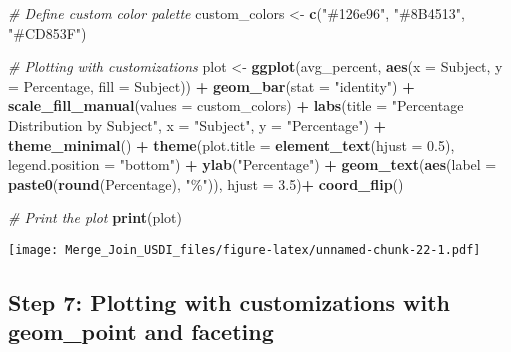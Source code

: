 \documentclass[
]{article}
\newenvironment{Shaded}{\begin{snugshade}}{\end{snugshade}}
\newcommand{\AttributeTok}[1]{\textcolor[rgb]{0.13,0.29,0.53}{#1}}
\newcommand{\CommentTok}[1]{\textcolor[rgb]{0.56,0.35,0.01}{\textit{#1}}}
\newcommand{\FloatTok}[1]{\textcolor[rgb]{0.00,0.00,0.81}{#1}}
\newcommand{\FunctionTok}[1]{\textcolor[rgb]{0.13,0.29,0.53}{\textbf{#1}}}
\newcommand{\NormalTok}[1]{#1}
\newcommand{\OtherTok}[1]{\textcolor[rgb]{0.56,0.35,0.01}{#1}}
\newcommand{\SpecialCharTok}[1]{\textcolor[rgb]{0.81,0.36,0.00}{\textbf{#1}}}
\newcommand{\StringTok}[1]{\textcolor[rgb]{0.31,0.60,0.02}{#1}}
\begin{document}
\begin{Shaded}
\begin{Highlighting}[]
\CommentTok{\# Define custom color palette}
\NormalTok{custom\_colors }\OtherTok{\textless{}{-}} \FunctionTok{c}\NormalTok{(}\StringTok{"\#126e96"}\NormalTok{, }\StringTok{"\#8B4513"}\NormalTok{, }\StringTok{"\#CD853F"}\NormalTok{) }

\CommentTok{\# Plotting with customizations}
\NormalTok{plot }\OtherTok{\textless{}{-}} \FunctionTok{ggplot}\NormalTok{(avg\_percent, }\FunctionTok{aes}\NormalTok{(}\AttributeTok{x =}\NormalTok{ Subject, }\AttributeTok{y =}\NormalTok{ Percentage, }\AttributeTok{fill =}\NormalTok{ Subject)) }\SpecialCharTok{+}
  \FunctionTok{geom\_bar}\NormalTok{(}\AttributeTok{stat =} \StringTok{"identity"}\NormalTok{) }\SpecialCharTok{+}
  \FunctionTok{scale\_fill\_manual}\NormalTok{(}\AttributeTok{values =}\NormalTok{ custom\_colors) }\SpecialCharTok{+}
  \FunctionTok{labs}\NormalTok{(}\AttributeTok{title =} \StringTok{"Percentage Distribution by Subject"}\NormalTok{,}
       \AttributeTok{x =} \StringTok{"Subject"}\NormalTok{, }\AttributeTok{y =} \StringTok{"Percentage"}\NormalTok{) }\SpecialCharTok{+}
  \FunctionTok{theme\_minimal}\NormalTok{() }\SpecialCharTok{+}
  \FunctionTok{theme}\NormalTok{(}\AttributeTok{plot.title =} \FunctionTok{element\_text}\NormalTok{(}\AttributeTok{hjust =} \FloatTok{0.5}\NormalTok{), }\AttributeTok{legend.position =} \StringTok{"bottom"}\NormalTok{) }\SpecialCharTok{+}
  \FunctionTok{ylab}\NormalTok{(}\StringTok{"Percentage"}\NormalTok{) }\SpecialCharTok{+}
  \FunctionTok{geom\_text}\NormalTok{(}\FunctionTok{aes}\NormalTok{(}\AttributeTok{label =} \FunctionTok{paste0}\NormalTok{(}\FunctionTok{round}\NormalTok{(Percentage), }\StringTok{"\%"}\NormalTok{)), }\AttributeTok{hjust =} \FloatTok{3.5}\NormalTok{)}\SpecialCharTok{+}
  \FunctionTok{coord\_flip}\NormalTok{()}

\CommentTok{\# Print the plot}
\FunctionTok{print}\NormalTok{(plot)}
\end{Highlighting}
\end{Shaded}

\texttt{[image: Merge\_Join\_USDI\_files/figure-latex/unnamed-chunk-22-1.pdf]}

\hypertarget{step-7-plotting-with-customizations-with-geom_point-and-faceting}{%
\subsection{Step 7: Plotting with customizations with geom\_point and
faceting}\label{step-7-plotting-with-customizations-with-geom_point-and-faceting}}
\end{document}
